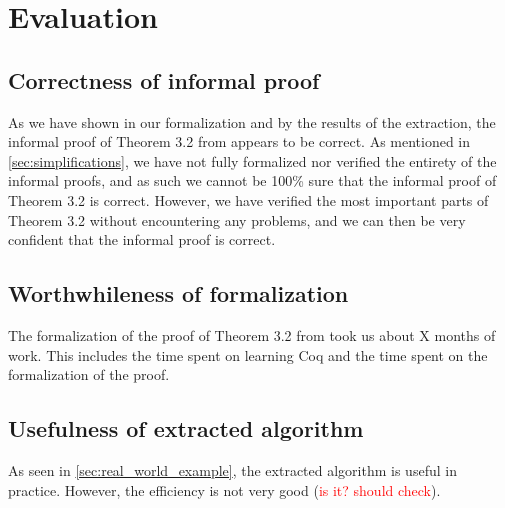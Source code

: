 \chapter{Evaluation}

\section{Correctness of informal proof}

As we have shown in our formalization and by the results of the
extraction, the informal proof of Theorem 3.2 from \cite{mbezem} appears to be correct.
As mentioned in \autoref{sec:simplifications}, we have not fully formalized nor verified the entirety of the informal proofs,
and as such we cannot be 100\% sure that the informal proof of Theorem 3.2 is correct.
However, we have verified the most important parts of Theorem 3.2 without
encountering any problems, and we can then be very confident that the informal proof is correct.

\section{Worthwhileness of formalization}

The formalization of the proof of Theorem 3.2 from \cite{mbezem} took us about X months of work.
This includes the time spent on learning Coq and the time spent on the formalization of the proof.

\section{Usefulness of extracted algorithm}

As seen in \autoref{sec:real_world_example}, the extracted algorithm is useful in practice.
However, the efficiency is not very good (\textcolor{red}{is it? should check}).
